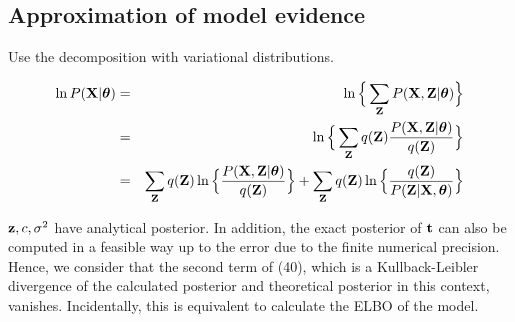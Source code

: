 \documentclass{article}
\begin{document}
	\subsection{Approximation of model evidence}
	Use the decomposition with variational distributions.
	
	\begin{eqnarray}
		\ln P(\bold{X}|\boldsymbol{\theta}) &=& \ln \Big\{\sum_\bold{Z}P(\bold{X}, \bold{Z} | \boldsymbol{\theta}) \Big\} \nonumber \\
		&=& \ln \Big\{\sum_\bold{Z}q(\bold{Z})\frac{P(\bold{X}, \bold{Z}|\boldsymbol{\theta})}{q(\bold{Z})} \Big\} \nonumber \\
		&=& \sum_\bold{Z}q(\bold{Z})\ln \Big\{ \frac{P(\bold{X}, \bold{Z}| \boldsymbol{\theta})}{q(\bold{Z})} \Big\} + \sum_\bold{Z}q(\bold{Z})\ln \Big\{ \frac{q(\bold{Z})}{P(\bold{Z}|\bold{X}, \boldsymbol{\theta})} \Big\}
	\end{eqnarray}
	
	$\bold{z}, c, \sigma^2$ have analytical posterior. In addition, the exact posterior of $\bold{t}$ can also be computed in a feasible way up to the error due to the finite numerical precision. Hence, we consider that the second term of (40), which is a Kullback-Leibler divergence of the calculated posterior and theoretical posterior in this context, vanishes. Incidentally, this is equivalent to calculate the ELBO of the model.
	
\end{document}
